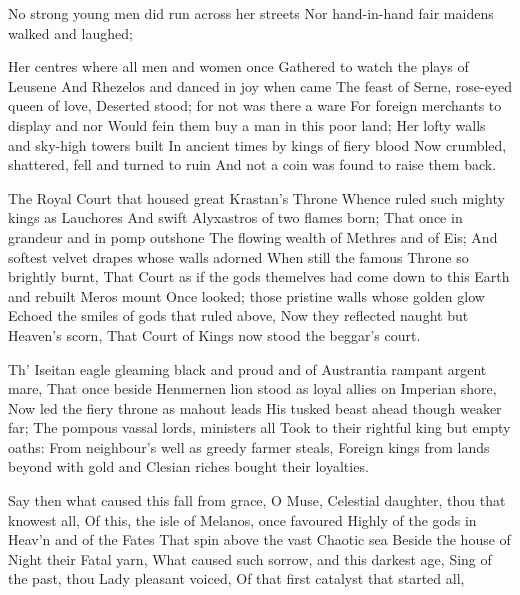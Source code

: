\documentclass[a4paper,12pt]{article}
\newcommand{\vel}{\verseline}
\begin{document}
\begin{poem}
\begin{stanza}
No strong young men did run across her streets\vel
Nor hand-in-hand fair maidens walked and laughed;
\end{stanza}
\begin{stanza}
Her centres where all men and women once\vel
Gathered to watch the plays of Leusene\vel
And Rhezelos and danced in joy when came\vel
The feast of Serne, rose-eyed queen of love,\vel
Deserted stood; for not was there a ware\vel
For foreign merchants to display and nor\vel
Would fein them buy a man in this poor land;\vel
Her lofty walls and sky-high towers built\vel
In ancient times by kings of fiery blood\vel
Now crumbled, shattered, fell and turned to ruin\vel
And not a coin was found to raise them back.
\end{stanza}
\begin{stanza}
The Royal Court that housed great Krastan's Throne\vel
Whence ruled such mighty kings as Lauchores\vel
And swift Alyxastros of two flames born;\vel
That once in grandeur and in pomp outshone\vel
The flowing wealth of Methres and of Eis;\vel
And softest velvet drapes whose walls adorned\vel
When still the famous Throne so brightly burnt,\vel
That Court as if the gods themelves had come\vel
down to this Earth and rebuilt Meros mount \vel
Once looked; those pristine walls whose golden glow\vel
Echoed the smiles of gods that ruled above,\vel
Now they reflected naught but Heaven's scorn,\vel
That Court of Kings now stood the beggar's court.
\end{stanza}
\begin{stanza}
Th' Iseitan eagle gleaming black and proud\vel
and of Austrantia rampant argent mare,\vel
That once beside Henmernen lion stood\vel
as loyal allies on Imperian shore,\vel
Now led the fiery throne as mahout leads\vel
His tusked beast ahead though weaker far;\vel
The pompous vassal lords, ministers all\vel
Took to their rightful king but empty oaths:\vel
From neighbour's well as greedy farmer steals,\vel
Foreign kings from lands beyond with gold\vel
and Clesian riches bought their loyalties.
\end{stanza}
\begin{stanza}
Say then what caused this fall from grace, O Muse,\vel
Celestial daughter, thou that knowest all,\vel
Of this, the isle of Melanos, once favoured\vel
Highly of the gods in Heav'n and of the Fates\vel
That spin above the vast Chaotic sea\vel
Beside the house of Night their Fatal yarn,\vel
What caused such sorrow, and this darkest age,\vel
Sing of the past, thou Lady pleasant voiced,\vel
Of that first catalyst that started all,\vel

\end{stanza}
\end{poem}
\end{document}
